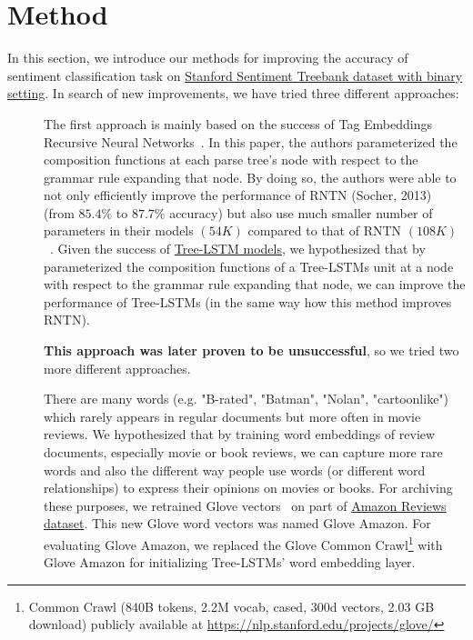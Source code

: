 \hypertarget{chap:method}{\chapter{Method}}\label{method}
In this section, we introduce our methods for improving the accuracy of sentiment classification task on \hyperref[sec:sst]{Stanford Sentiment Treebank dataset with binary setting}.
In search of new improvements, we have tried three different approaches:
\begin{description}
\item[] The first approach is mainly based on the success of Tag Embeddings Recursive Neural Networks~\cite{tag-embedding-rnn}.
In this paper, the authors parameterized the composition functions at each parse tree's node with respect to the grammar rule expanding that node.
By doing so, the authors were able to not only efficiently improve the performance of RNTN (Socher, 2013)~\cite{socher2013recursive} (from \(85.4\%\) to \(87.7\%\) accuracy) but also use much smaller number of parameters in their models \((54K)\) compared to that of RNTN \((108K)\)~\cite{tag-embedding-rnn}.
Given the success of \hyperref[sec:treelstm]{Tree-LSTM models}, we hypothesized that by parameterized the composition functions of a Tree-LSTMs unit at a node with respect to the grammar rule expanding that node, we can improve the performance of Tree-LSTMs (in the same way how this method improves RNTN).

\textbf{This approach was later proven to be unsuccessful}, so we tried two more different approaches.

\item[] \label{movie-hypothesis} There are many words (e.g. "B-rated", "Batman", "Nolan", "cartoonlike") which rarely appears in regular documents but more often in movie reviews.
We hypothesized that by training word embeddings of review documents, especially movie or book reviews, we can capture more rare words and also the different way people use words (or different word relationships) to express their opinions on movies or books.
For archiving these purposes, we retrained Glove vectors~\cite{glove} on part of  \hyperref[sec:amazon]{Amazon Reviews dataset}.
This new Glove word vectors was named Glove Amazon.
For evaluating Glove Amazon, we replaced the Glove Common Crawl\footnote{Common Crawl (840B tokens, 2.2M vocab, cased, 300d vectors, 2.03 GB download) publicly available at \url{https://nlp.stanford.edu/projects/glove/}} with Glove Amazon for initializing Tree-LSTMs' word embedding layer.


\end{description}
